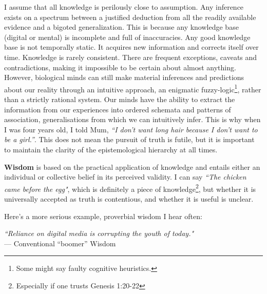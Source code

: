 
I assume that all knowledge is perilously close to assumption. Any inference exists on a spectrum between a justified deduction from all the readily available evidence and a bigoted generalization. This is because any knowledge base (digital or mental) is incomplete and full of inaccuracies. Any good knowledge base is not temporally static. It acquires new information and corrects itself over time. Knowledge is rarely consistent. There are frequent exceptions, caveats and contradictions, making it impossible to be certain about almost anything. However, biological minds can still make material inferences and predictions about our reality through an intuitive approach, an enigmatic fuzzy-logic\footnote{Some might say faulty cognitive heuristics.}, rather than a strictly rational system. Our minds have the ability to extract the information from our experiences into ordered schemata and patterns of association, generalisations from which we can intuitively infer. This is why when I was four years old, I told Mum, \textit{``I don't want long hair because I don't want to be a girl.''}. This does not mean the pursuit of truth is futile, but it is important to maintain the clarity of the epistemological hierarchy at all times.


\textbf{Wisdom} is based on the practical application of knowledge and entails either an individual or collective belief in its perceived validity. I can say \textit{``The chicken came before the egg"}, which is definitely a piece of knowledge\footnote{Especially if one trusts Genesis 1:20-22}, but whether it is universally accepted as truth is contentious, and whether it is useful is unclear. 

Here's a more serious example, proverbial wisdom I hear often:

\begin{center}
\textit{``Reliance on digital media is corrupting the youth of today."}
\\ --- Conventional ``boomer'' Wisdom
\end{center}

